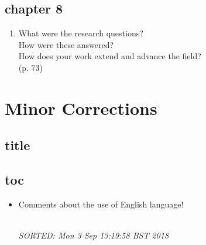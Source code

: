 \documentclass[10pt]{article}
\begin{document}
\subsection{chapter 8}

\begin{enumerate}[noitemsep,topsep=0pt]

\item What were the research questions? \\
	How were these answered?\\
	How does your work extend and advance the field?\\
	(p. 73)

\end{enumerate}







\section{Minor Corrections}

\subsection{title}




\subsection{toc}

\begin{itemize}[noitemsep,topsep=0pt]
\item Comments about the use of English language!

\textit{
\\
SORTED:  Mon  3 Sep 13:19:58 BST 2018
}

\end{itemize}
\end{document}
